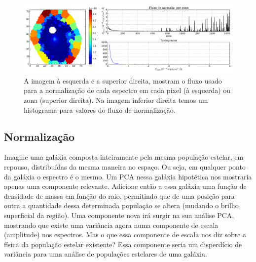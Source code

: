\begin{figure}
    \includegraphics[width=1.\textwidth]{figuras/K0277-fobs_norm.pdf}
    \caption[Fluxos de normalização para cada zona da galáxia K0277.]
    {A imagem à esquerda e a superior direita, mostram o fluxo usado para a normalização de cada espectro em
    cada pixel (à esquerda) ou zona (superior direita). Na imagem inferior direita temos um histograma para valores do
    fluxo de normalização.}
    \label{fig:UsoPCA:K277fobsnorm}
\end{figure}

\subsection{Normalização}
\label{sec:UsoPCA:PCAlidades:norm}

Imagine uma galáxia composta inteiramente pela mesma população estelar, em repouso, distribuídas da mesma maneira no
espaço. Ou seja, em qualquer ponto da galáxia o espectro é o mesmo. Um PCA nessa galáxia hipotética nos mostraria apenas
uma componente relevante. Adicione então a essa galáxia uma função de densidade de massa em função do raio, permitindo
que de uma posição para outra a quantidade dessa determinada população se altera (mudando o brilho superficial da
região). Uma componente nova irá surgir na sua análise PCA, mostrando que existe uma variância agora numa componente de
escala (amplitude) nos espectros. Mas o que essa componente de escala nos diz sobre a física da população estelar
existente? Essa componente seria um disperdício de variância para uma análise de populações estelares de uma galáxia.

